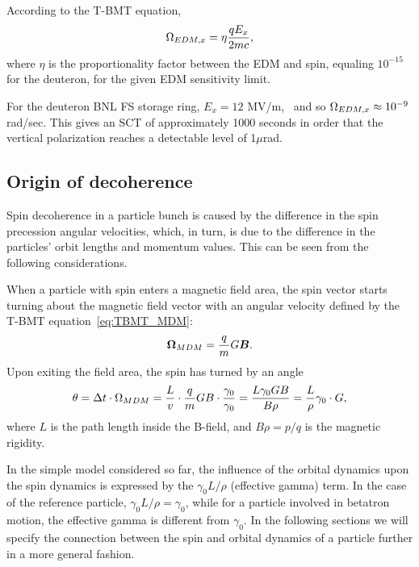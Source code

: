 \documentclass{article}
\begin{document}
According to the T-BMT equation,
\[
\Omega_{EDM,x} = \eta\frac{qE_x}{2mc},
\]
where $\eta$ is the proportionality factor between the EDM and spin, equaling $10^{-15}$ for the deuteron, for the given EDM sensitivity limit.~\citep[p.~206]{Eremey:Thesis}

For the deuteron BNL FS storage ring, $E_x = 12$ MV/m,~\citep[p.~19]{BNL:Deuteron2008} and so $\Omega_{EDM,x}\approx 10^{-9}$ rad/sec. This gives an SCT of approximately 1000 seconds in order that the vertical polarization reaches a detectable level of 1$\mu$rad.~\citep[p.~207]{Eremey:Thesis}

\subsection{Origin of decoherence}\label{sec:Decoh_origin}
Spin decoherence in a particle bunch is caused by the difference in the spin precession angular velocities, which, in turn, is due to the difference in the particles' orbit lengths and momentum values. This can be seen from the following considerations.

When a particle with spin enters a magnetic field area, the spin vector starts turning about the magnetic field vector with an angular velocity defined by the T-BMT equation~\eqref{eq:TBMT_MDM}:
\begin{equation*}
  \boldsymbol{\Omega}_{MDM} = \frac qm G\boldsymbol B.
\end{equation*}
Upon exiting the field area, the spin has turned by an angle
\begin{equation*}
  \theta = \Delta t\cdot\Omega_{MDM} = \frac Lv \cdot \frac qm GB\cdot \frac{\gamma_0}{\gamma_0} = \frac{L\gamma_0 GB}{B\rho} = \frac L\rho\gamma_0\cdot G,
\end{equation*}
where $L$ is the path length inside the B-field, and $B\rho = p/q$ is the magnetic rigidity.

In the simple model considered so far, the influence of the orbital dynamics upon the spin dynamics is expressed by the $\gamma_0 L/\rho$ (effective gamma) term. In the case of the reference particle, $\gamma_0L/\rho = \gamma_0$, while for a particle involved in betatron motion, the effective gamma is different from $\gamma_0$. In the following sections we will specify the connection between the spin and orbital dynamics of a particle further in a more general fashion.
\end{document}
